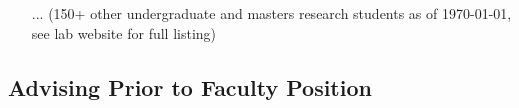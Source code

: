 \documentclass[10pt,letterpaper]{article}
\renewenvironment{itemize}{
  \begin{list}{}{
    \setlength{\leftmargin}{1.25em}
    \setlength{\itemsep}{0.25em}
    \setlength{\parskip}{0pt}
    \setlength{\parsep}{0.2em}
  }
}{
  \end{list}
}
\begin{document}
\begin{itemize}
\begin{enumerate}
          \item[...] (150+ other undergraduate and masters research students as of \today, see lab website for full listing)
        \end{enumerate}
\end{itemize}

\subsection*{Advising Prior to Faculty Position}
\end{document}
